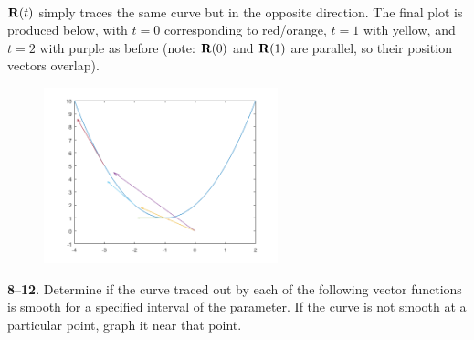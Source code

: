 \documentclass[12pt]{amsbook}
\begin{document}
\\
${\bf R}(t)$ simply traces the same curve but in the opposite direction. The final plot is produced below, with $t=0$ corresponding to red/orange, $t=1$ with yellow, and $t=2$ with purple as before (note: ${\bf R}(0)$ and ${\bf R}(1)$ are parallel, so their position vectors overlap).
\begin{center}
\includegraphics[width=3.5in,height=2.0in]{2_11_7_6.png}
\end{center}
\noindent
{\small {\bf 8}--{\bf 12}}. Determine if the curve traced out by each of the following vector
functions is smooth for a specified interval of the parameter. If the curve is
not smooth at a particular point, graph it near that point.
\end{document}
